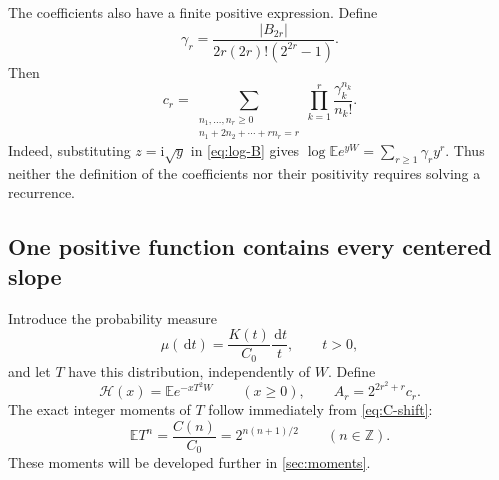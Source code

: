 \documentclass[11pt,a4paper]{article}
\numberwithin{equation}{section}
\theoremstyle{definition}
\theoremstyle{remark}
\newcommand{\E}{\mathbb E}
\newcommand{\Z}{\mathbb Z}
\newcommand{\ii}{\mathrm i}
\newcommand{\dd}{\,\mathrm d}
\newcommand{\abs}[1]{\left|#1\right|}
\newcommand{\calH}{\mathcal H}
\begin{document}
The coefficients also have a finite positive expression. Define
\begin{equation}
 \gamma_r=\frac{\abs{B_{2r}}}{2r(2r)!(2^{2r}-1)}.
 \label{eq:gamma-positive}
\end{equation}
Then
\begin{equation}
 \boxed{\displaystyle
 c_r=\sum_{\substack{n_1,\ldots,n_r\ge0\\
                    n_1+2n_2+\cdots+rn_r=r}}
           \prod_{k=1}^r\frac{\gamma_k^{n_k}}{n_k!}.}
 \label{eq:c-finite}
\end{equation}
Indeed, substituting $z=\ii\sqrt y$ in \cref{eq:log-B} gives
$\log\E e^{yW}=\sum_{r\ge1}\gamma_ry^r$.
Thus neither the definition of the coefficients nor their positivity
requires solving a recurrence.

\subsection{One positive function contains every centered slope}
Introduce the probability measure
\begin{equation}
 \mu(\dd t)=\frac{K(t)}{C_0}\frac{\dd t}{t},\qquad t>0,
 \label{eq:mu}
\end{equation}
and let $T$ have this distribution, independently of $W$.
Define
\begin{equation}
 \calH(x)=\E e^{-xT^2W}\qquad(x\ge0),
 \qquad A_r=2^{2r^2+r}c_r.
 \label{eq:calH}
\end{equation}
The exact integer moments of $T$ follow immediately from
\cref{eq:C-shift}:
\begin{equation}
 \E T^n=\frac{C(n)}{C_0}=2^{n(n+1)/2}
 \qquad(n\in\Z).
 \label{eq:T-moments}
\end{equation}
These moments will be developed further in \cref{sec:moments}.
\end{document}
